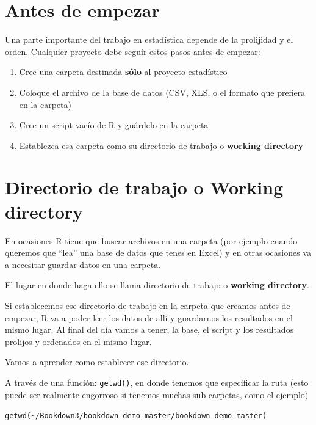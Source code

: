 \documentclass[
]{book}
\providecommand{\tightlist}{%
  \setlength{\itemsep}{0pt}\setlength{\parskip}{0pt}}
\begin{document}
\hypertarget{antes-de-empezar}{%
\section{Antes de empezar}\label{antes-de-empezar}}

Una parte importante del trabajo en estadística depende de la prolijidad y el orden. Cualquier proyecto debe seguir estos pasos antes de empezar:

\begin{enumerate}
\def\labelenumi{\arabic{enumi}.}
\tightlist
\item
  Cree una carpeta destinada \textbf{sólo} al proyecto estadístico
\item
  Coloque el archivo de la base de datos (CSV, XLS, o el formato que prefiera en la carpeta)
\item
  Cree un script vacío de R y guárdelo en la carpeta
\item
  Establezca esa carpeta como su directorio de trabajo o \textbf{working directory}
\end{enumerate}

\hypertarget{directorio-de-trabajo-o-working-directory}{%
\section{Directorio de trabajo o Working directory}\label{directorio-de-trabajo-o-working-directory}}

En ocasiones R tiene que buscar archivos en una carpeta (por ejemplo cuando queremos que ``lea'' una base de datos que tenes en Excel) y en otras ocasiones va a necesitar guardar datos en una carpeta.

El lugar en donde haga ello se llama directorio de trabajo o \textbf{working directory}.

Si establecemos ese directorio de trabajo en la carpeta que creamos antes de empezar, R va a poder leer los datos de allí y guardarnos los resultados en el mismo lugar. Al final del día vamos a tener, la base, el script y los resultados prolijos y ordenados en el mismo lugar.

Vamos a aprender como establecer ese directorio.

A través de una función: \texttt{getwd()}, en donde tenemos que especificar la ruta (esto puede ser realmente engorroso si tenemos muchas sub-carpetas, como el ejemplo)

\texttt{getwd(\textasciitilde{}/Bookdown3/bookdown-demo-master/bookdown-demo-master)}
\end{document}
